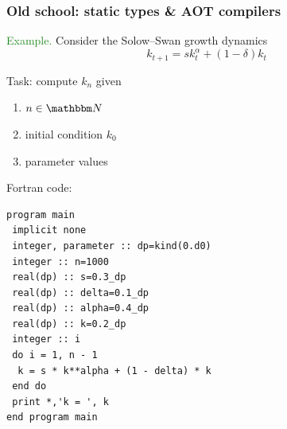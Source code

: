 \documentclass[
    xcolor={svgnames,dvipsnames},
    hyperref={colorlinks, citecolor=DeepPink4, linkcolor=DarkRed, urlcolor=DarkBlue}
    ]{beamer}  %
\newcommand{\Eg}{\textcolor{ForestGreen}{Example. }}
\newcommand{\1}{\mathbbm 1}
\newcommand{\NN}{\mathbbm N}
\begin{document}
\begin{frame}
    \frametitle{Old school: static types \& AOT compilers}

    \Eg Consider the Solow--Swan growth dynamics
    \begin{equation*}
        k_{t+1} = s k_t^\alpha + (1 - \delta) k_t
    \end{equation*}

        \vspace{0.5em}
        \vspace{0.5em}
    Task: compute $k_n$ given 
    \begin{enumerate}
        \item $n \in \NN$
        \item initial condition $k_0$ 
        \item parameter values
    \end{enumerate}

        \vspace{0.5em}
        \vspace{0.5em}
        \vspace{0.5em}

    Fortran code:


\end{frame}




\begin{frame}[fragile]
    
    \begin{verbatim}
program main
 implicit none
 integer, parameter :: dp=kind(0.d0)                          
 integer :: n=1000
 real(dp) :: s=0.3_dp
 real(dp) :: delta=0.1_dp
 real(dp) :: alpha=0.4_dp
 real(dp) :: k=0.2_dp
 integer :: i
 do i = 1, n - 1                                                
  k = s * k**alpha + (1 - delta) * k
 end do
 print *,'k = ', k
end program main
    \end{verbatim}

\end{frame}
\end{document}
